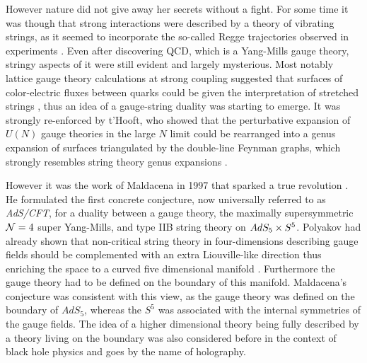 However nature did not give away her secrets without a fight. 
For some time it was though that strong interactions were described by a theory of vibrating strings, as it seemed to incorporate the so-called Regge trajectories observed in experiments \cite{Veneziano:1968}. 
Even after discovering QCD, which is a Yang-Mills gauge theory, stringy aspects of it were still evident and largely mysterious. 
Most notably lattice gauge theory calculations at strong coupling suggested that surfaces of color-electric fluxes between quarks could be given the interpretation of stretched strings \cite{Wilson:1974}, thus an idea of a gauge-string duality was starting to emerge. 
It was strongly re-enforced by t'Hooft, who showed that the perturbative expansion of $U(N)$ gauge theories in the large $N$ limit could be rearranged into a genus expansion of surfaces triangulated by the double-line Feynman graphs, which strongly resembles string theory genus expansions \cite{THooft:1974}.

\vspace{20pt}
\newlength\yearposx
{}
\vspace{20pt}

However it was the work of Maldacena in 1997 that sparked a true revolution \cite{Maldacena:1997re}. 
He formulated the first concrete conjecture, now universally referred to as \emph{AdS/CFT}, for a duality between a gauge theory, the maximally supersymmetric $\mathcal{N}=4$ super Yang-Mills, and type IIB string theory on $AdS_5 \times S^5$. 
Polyakov had already shown that non-critical string theory in four-dimensions describing gauge fields should be complemented with an extra Liouville-like direction thus enriching the space to a curved five dimensional manifold \cite{Polyakov:1997tj}. Furthermore the gauge theory had to be defined on the boundary of this manifold.
Maldacena's conjecture was consistent with this view, as the gauge theory was defined on the boundary of $AdS_5$, whereas the $S^5$ was associated with the internal symmetries of the gauge fields.
The idea of a higher dimensional theory being fully described by a theory living on the boundary was also considered before in the context of black hole physics \cite{'tHooft:1993gx, Susskind:1994vu} and goes by the name of holography.

